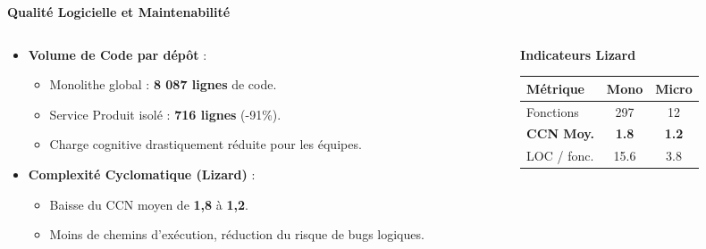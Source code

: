 \documentclass[10pt,aspectratio=169]{beamer}
\begin{document}
\begin{frame}{\textbf{Qualité Logicielle et Maintenabilité}}
    \begin{columns}
        \begin{column}{0.6\textwidth}
            \begin{itemize}
                \item \textbf{Volume de Code par dépôt} :
                      \begin{itemize}
                          \item Monolithe global : \textbf{8 087 lignes} de code.
                          \item Service Produit isolé : \textbf{716 lignes} (-91\%).
                          \item Charge cognitive drastiquement réduite pour les équipes.
                      \end{itemize}
                \item \textbf{Complexité Cyclomatique (Lizard)} :
                      \begin{itemize}
                          \item Baisse du CCN moyen de \textbf{1,8} à \textbf{1,2}.
                          \item Moins de chemins d'exécution, réduction du risque de bugs logiques.
                      \end{itemize}
            \end{itemize}
        \end{column}
        \begin{column}{0.4\textwidth}
            \begin{block}{\textbf{Indicateurs Lizard}}
                \renewcommand{\arraystretch}{1.2}
                \begin{tabular}{lcc}
                    \toprule
                    \textbf{Métrique} & \textbf{Mono} & \textbf{Micro} \\
                    \midrule
                    Fonctions & 297 & 12 \\
                    \textbf{CCN Moy.} & \textbf{1.8} & \textbf{1.2} \\
                    LOC / fonc. & 15.6 & 3.8 \\
                    \bottomrule
                \end{tabular}
            \end{block}
        \end{column}
    \end{columns}
\end{frame}
\end{document}
